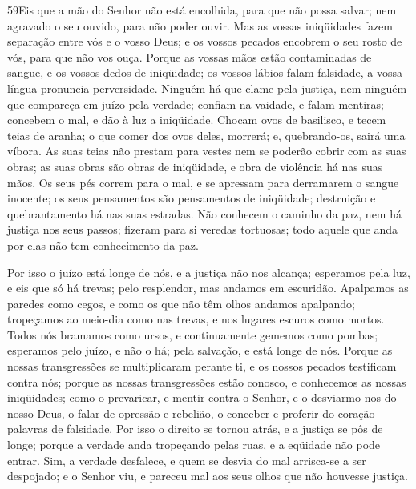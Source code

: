 \medskip

\lettrine{59}{}Eis que a mão do Senhor não está encolhida, para
que não possa salvar; nem agravado o seu ouvido, para não poder
ouvir. Mas as vossas iniqüidades fazem separação entre vós e o
vosso Deus; e os vossos pecados encobrem o seu rosto de vós, para
que não vos ouça. Porque as vossas mãos estão contaminadas de
sangue, e os vossos dedos de iniqüidade; os vossos lábios falam
falsidade, a vossa língua pronuncia perversidade. Ninguém há que
clame pela justiça, nem ninguém que compareça em juízo pela verdade;
confiam na vaidade, e falam mentiras; concebem o mal, e dão à luz a
iniqüidade. Chocam ovos de basilisco, e tecem teias de aranha; o
que comer dos ovos deles, morrerá; e, quebrando-os, sairá uma
víbora. As suas teias não prestam para vestes nem se poderão
cobrir com as suas obras; as suas obras são obras de iniqüidade, e
obra de violência há nas suas mãos. Os seus pés correm para o
mal, e se apressam para derramarem o sangue inocente; os seus
pensamentos são pensamentos de iniqüidade; destruição e
quebrantamento há nas suas estradas. Não conhecem o caminho da
paz, nem há justiça nos seus passos; fizeram para si veredas
tortuosas; todo aquele que anda por elas não tem conhecimento da
paz.

Por isso o juízo está longe de nós, e a justiça não nos alcança;
esperamos pela luz, e eis que só há trevas; pelo resplendor, mas
andamos em escuridão. Apalpamos as paredes como cegos, e como
os que não têm olhos andamos apalpando; tropeçamos ao meio-dia como
nas trevas, e nos lugares escuros como mortos. Todos nós
bramamos como ursos, e continuamente gememos como pombas; esperamos
pelo juízo, e não o há; pela salvação, e está longe de nós.
Porque as nossas transgressões se multiplicaram perante ti, e
os nossos pecados testificam contra nós; porque as nossas
transgressões estão conosco, e conhecemos as nossas iniqüidades;
como o prevaricar, e mentir contra o Senhor, e o
desviarmo-nos do nosso Deus, o falar de opressão e rebelião, o
conceber e proferir do coração palavras de falsidade. Por
isso o direito se tornou atrás, e a justiça se pôs de longe; porque
a verdade anda tropeçando pelas ruas, e a eqüidade não pode entrar.
Sim, a verdade desfalece, e quem se desvia do mal arrisca-se
a ser despojado; e o Senhor viu, e pareceu mal aos seus olhos que
não houvesse justiça.

